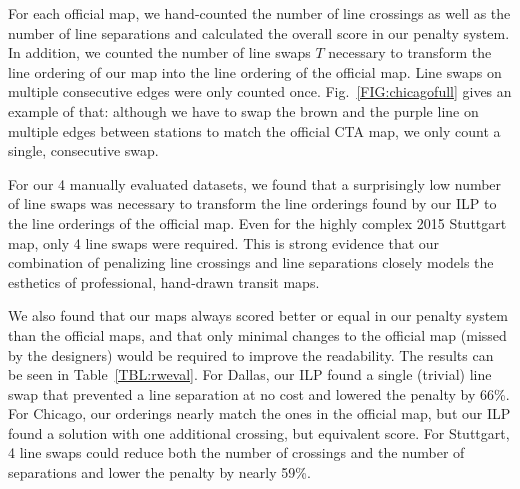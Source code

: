 \documentclass[format=acmsmall, review=false, screen=true]{acmart}
\begin{document}
For each official map, we hand-counted the number of line crossings as well as the number of line separations and calculated the overall score in our penalty system. In addition, we counted the number of line swaps $T$ necessary to transform the line ordering of our map into the line ordering of the official map. Line swaps on multiple consecutive edges were only counted once. Fig.~\ref{FIG:chicagofull} gives an example of that: although we have to swap the brown and the purple line on multiple edges between stations to match the official CTA map, we only count a single, consecutive swap. 

For our 4 manually evaluated datasets, we found that a surprisingly low number of line swaps was necessary to transform the line orderings found by our ILP to the line orderings of the official map. Even for the highly complex 2015 Stuttgart map, only 4 line swaps were required. This is strong evidence that our combination of penalizing line crossings and line separations closely models the esthetics of professional, hand-drawn transit maps.

We also found that our maps always scored better or equal in our penalty system than the official maps, and that only minimal changes to the official map (missed by the designers) would be required to improve the readability. The results can be seen in Table~\ref{TBL:rweval}. For Dallas, our ILP found a single (trivial) line swap that prevented a line separation at no cost and lowered the penalty by 66\%. For Chicago, our orderings nearly match the ones in the official map, but our ILP found a solution with one additional crossing, but equivalent score. For Stuttgart, 4 line swaps could reduce both the number of crossings and the number of separations and lower the penalty by nearly 59\%.
\end{document}
